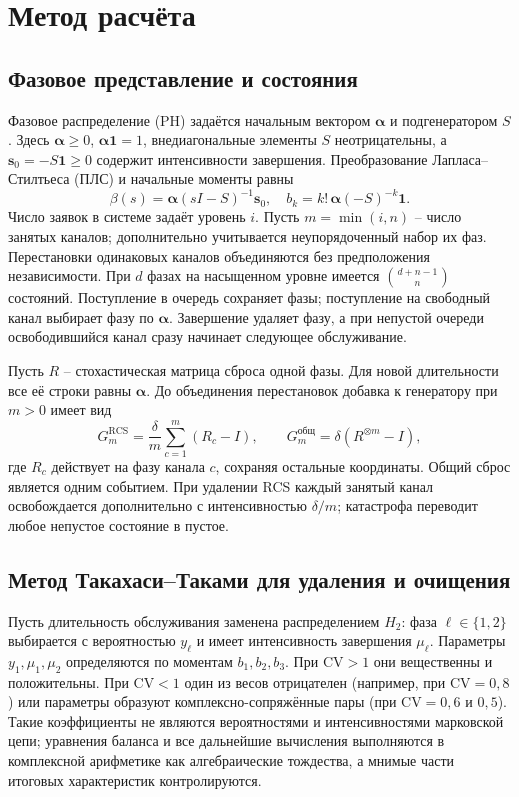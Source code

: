 \documentclass[a4paper,12pt]{article}
\begin{document}
\section{Метод расчёта}
\subsection{Фазовое представление и состояния}
Фазовое распределение (PH) задаётся начальным вектором \(\boldsymbol\alpha\) и подгенератором \(S\). Здесь \(\boldsymbol\alpha\ge0\), \(\boldsymbol\alpha\mathbf1=1\), внедиагональные элементы \(S\) неотрицательны, а \(\boldsymbol s_0=-S\mathbf1\ge0\) содержит интенсивности завершения. Преобразование Лапласа--Стилтьеса (ПЛС) и начальные моменты равны
\[
\beta(s)=\boldsymbol\alpha(sI-S)^{-1}\boldsymbol s_0,\quad
b_k=k!\,\boldsymbol\alpha(-S)^{-k}\mathbf1.
\]
Число заявок в системе задаёт уровень \(i\). Пусть \(m=\min(i,n)\) -- число занятых каналов; дополнительно учитывается неупорядоченный набор их фаз. Перестановки одинаковых каналов объединяются без предположения независимости. При \(d\) фазах на насыщенном уровне имеется \(\binom{d+n-1}{n}\) состояний. Поступление в очередь сохраняет фазы; поступление на свободный канал выбирает фазу по \(\boldsymbol\alpha\). Завершение удаляет фазу, а при непустой очереди освободившийся канал сразу начинает следующее обслуживание.

Пусть \(R\) -- стохастическая матрица сброса одной фазы. Для новой длительности все её строки равны \(\boldsymbol\alpha\). До объединения перестановок добавка к генератору при \(m>0\) имеет вид
\[
G_m^{\mathrm{RCS}}=\frac{\delta}{m}\sum_{c=1}^{m}(R_c-I),\qquad
G_m^{\text{общ}}=\delta(R^{\otimes m}-I),
\]
где \(R_c\) действует на фазу канала \(c\), сохраняя остальные координаты. Общий сброс является одним событием. При удалении RCS каждый занятый канал освобождается дополнительно с интенсивностью \(\delta/m\); катастрофа переводит любое непустое состояние в пустое.

\subsection{Метод Такахаси--Таками для удаления и очищения}\label{sec:tt}
Пусть длительность обслуживания заменена распределением \(H_2\): фаза \(\ell\in\{1,2\}\) выбирается с вероятностью \(y_\ell\) и имеет интенсивность завершения \(\mu_\ell\). Параметры \(y_1,\mu_1,\mu_2\) определяются по моментам \(b_1,b_2,b_3\). При \(\mathrm{CV}>1\) они вещественны и положительны. При \(\mathrm{CV}<1\) один из весов отрицателен (например, при \(\mathrm{CV}=0{,}8\)) или параметры образуют комплексно-сопряжённые пары (при \(\mathrm{CV}=0{,}6\) и \(0{,}5\)). Такие коэффициенты не являются вероятностями и интенсивностями марковской цепи; уравнения баланса и все дальнейшие вычисления выполняются в комплексной арифметике как алгебраические тождества, а мнимые части итоговых характеристик контролируются.
\end{document}
